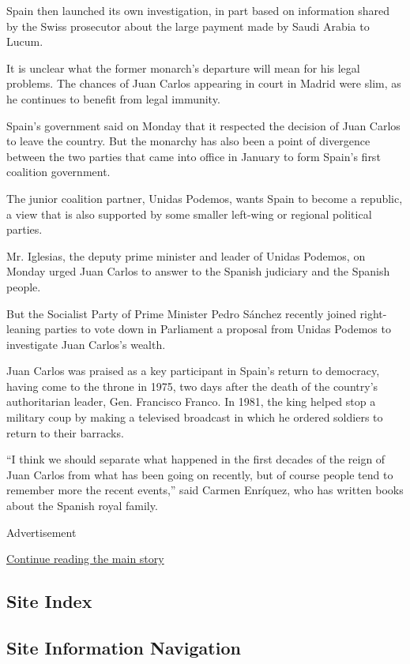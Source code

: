 Spain then launched its own investigation, in part based on information
shared by the Swiss prosecutor about the large payment made by Saudi
Arabia to Lucum.

It is unclear what the former monarch's departure will mean for his
legal problems. The chances of Juan Carlos appearing in court in Madrid
were slim, as he continues to benefit from legal immunity.

Spain's government said on Monday that it respected the decision of Juan
Carlos to leave the country. But the monarchy has also been a point of
divergence between the two parties that came into office in January to
form Spain's first coalition government.

The junior coalition partner, Unidas Podemos, wants Spain to become a
republic, a view that is also supported by some smaller left-wing or
regional political parties.

Mr. Iglesias, the deputy prime minister and leader of Unidas Podemos, on
Monday urged Juan Carlos to answer to the Spanish judiciary and the
Spanish people.

But the Socialist Party of Prime Minister Pedro Sánchez recently joined
right-leaning parties to vote down in Parliament a proposal from Unidas
Podemos to investigate Juan Carlos's wealth.

Juan Carlos was praised as a key participant in Spain's return to
democracy, having come to the throne in 1975, two days after the death
of the country's authoritarian leader, Gen. Francisco Franco. In 1981,
the king helped stop a military coup by making a televised broadcast in
which he ordered soldiers to return to their barracks.

``I think we should separate what happened in the first decades of the
reign of Juan Carlos from what has been going on recently, but of course
people tend to remember more the recent events,'' said Carmen Enríquez,
who has written books about the Spanish royal family.

Advertisement

\protect\hyperlink{after-bottom}{Continue reading the main story}

\hypertarget{site-index}{%
\subsection{Site Index}\label{site-index}}

\hypertarget{site-information-navigation}{%
\subsection{Site Information
Navigation}\label{site-information-navigation}}

